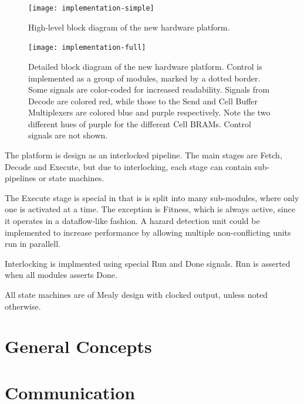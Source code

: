 \begin{figure}[!ht]
    \centering
    \texttt{[image: implementation-simple]}
    \caption{High-level block diagram of the new hardware platform.}
    \label{fig:implementation-simple}
\end{figure}

\begin{figure}
    \centering
    \texttt{[image: implementation-full]}
    \caption[Detailed block diagram of the new hardware platform.]{
        Detailed block diagram of the new hardware platform.
        Control is implemented as a group of modules, marked by a dotted border.
        Some signals are color-coded for increased readability.
        Signals from Decode are colored red, while those to the Send and Cell Buffer Multiplexers are colored blue and purple respectively.
        Note the two different hues of purple for the different Cell BRAMs.
        Control signals are not shown.
    }
    \label{fig:implementation-full}
\end{figure}

The platform is design as an interlocked pipeline.
The main stages are Fetch, Decode and Execute, but due to interlocking, each stage can contain sub-pipelines or state machines.

The Execute stage is special in that is is split into many sub-modules, where only one is activated at a time.
The exception is Fitness, which is always active, since it operates in a dataflow-like fashion.
A hazard detection unit could be implemented to increase performance by allowing multiple non-conflicting units run in parallell.

Interlocking is implmented using special Run and Done signals.
Run is asserted when all modules asserts Done.

All state machines are of Mealy design with clocked output, unless noted otherwise.

\section{General Concepts}





\section{Communication}

